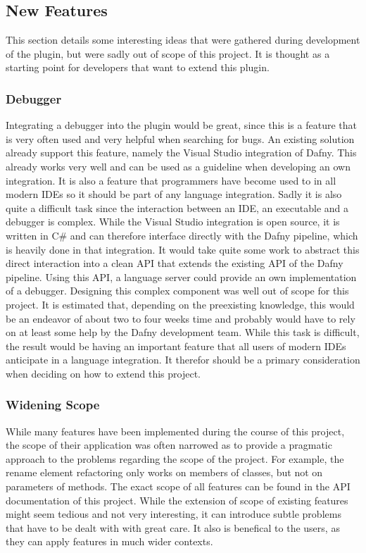 \subsection{New Features} \label{featureExtensions}
This section details some interesting ideas that were gathered during development of the plugin, but were sadly out of scope of this project. It is thought as a starting point for developers that want to extend this plugin. 
\subsubsection{Debugger}
Integrating a debugger into the plugin would be great, since this is a feature that is very often used and very helpful when searching for bugs. An existing solution already support this feature, namely the Visual Studio integration \cite{visualstudiodafny} of Dafny. This already works very well and can be used as a guideline when developing an own integration. It is also a feature that programmers have become used to in all modern IDEs so it should be part of any language integration. \newline
Sadly it is also quite a difficult task since the interaction between an IDE, an executable and a debugger is complex. While the Visual Studio integration is open source, it is written in C\# and can therefore interface directly with the Dafny pipeline, which is heavily done in that integration. It would take quite some work to abstract this direct interaction into a clean API that extends the existing API of the Dafny pipeline. Using this API, a language server could provide an own implementation of a debugger.\newline
Designing this complex component was well out of scope for this project. It is estimated that, depending on the preexisting knowledge, this would be an endeavor of about two to four weeks time and probably would have to rely on at least some help by the Dafny development team. While this task is difficult, the result would be having an important feature that all users of modern IDEs anticipate in a language integration. It therefor should be a primary consideration when deciding on how to extend this project. 
\subsubsection{Widening Scope}
While many features have been implemented during the course of this project, the scope of their application was often narrowed as to provide a pragmatic approach to the problems regarding the scope of the project. For example, the rename element refactoring only works on members of classes, but not on parameters of methods. \newline
The exact scope of all features can be found in the API documentation of this project. While the extension of scope of existing features might seem tedious and not very interesting, it can introduce subtle problems that have to be dealt with with great care. It also is benefical to the users, as they can apply features in much wider contexts. 
